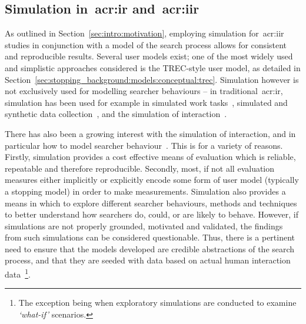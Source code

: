 \subsection{Simulation in~\gls{acr:ir} and~\gls{acr:iir}}\label{sec:ir_background:user:simulation}
As outlined in Section~\ref{sec:intro:motivation}, employing simulation for~\gls{acr:iir} studies in conjunction with a model of the search process allows for consistent and reproducible results. Several user models exist; one of the most widely used and simplistic approaches considered is the TREC-style user model, as detailed in Section~\ref{sec:stopping_background:models:conceptual:trec}. Simulation however is not exclusively used for modelling searcher behaviours -- in traditional~\gls{acr:ir}, simulation has been used for example in simulated work tasks~\citep{borlund2003iir_model, voorhees2005trec_book}, simulated and synthetic data collection~\citep{azzopardi2009query_side, azzopardi2007languages, jordan2006cqg, tague1980simulation_bibliographic}, and the simulation of interaction~\citep{azzopardi2010workshop, carterette2011effectiveness_evaluation, clarke2013mube,  leuski2000relevance_reinforcement, white2004simulated_feedback_models}.

There has also been a growing interest with the simulation of interaction, and in particular how to model searcher behaviour~\citep{azzopardi2010workshop, clarke2013mube}. This is for a variety of reasons. Firstly, simulation provides a cost effective means of evaluation which is reliable, repeatable and therefore reproducible. Secondly, most, if not all evaluation measures either implicitly or explicitly encode some form of user model (typically a stopping model) in order to make measurements. Simulation also provides a means in which to explore different searcher behaviours, methods and techniques to better understand how searchers do, could, or are likely to behave. However, if simulations are not properly grounded, motivated and validated, the findings from such simulations can be considered questionable. Thus, there is a pertinent need to ensure that the models developed are credible abstractions of the search process, and that they are seeded with data based on actual human interaction data~\citep{azzopardi2010workshop}\footnote{\scriptsize{The exception being when exploratory simulations are conducted to examine \emph{`what-if'} scenarios.}}. 

